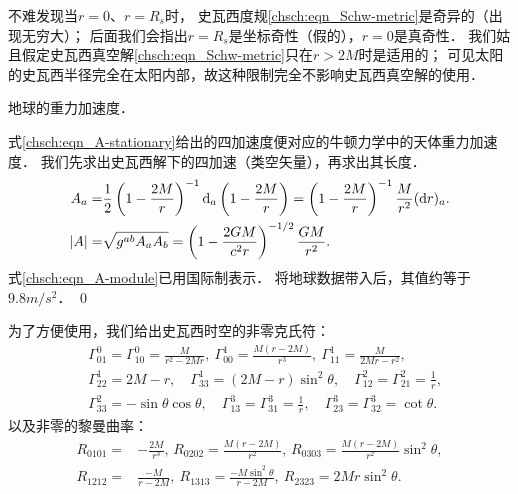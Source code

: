 不难发现当$r=0$、$r=R_s$时，
史瓦西度规\eqref{chsch:eqn_Schw-metric}是奇异的（出现无穷大）；
后面我们会指出$r=R_s$是坐标奇性（假的），$r=0$是真奇性．
我们姑且假定史瓦西真空解\eqref{chsch:eqn_Schw-metric}只在$r>2M$时是适用的；
可见太阳的史瓦西半径完全在太阳内部，故这种限制完全不影响史瓦西真空解的使用．



\begin{example}
    地球的重力加速度．
\end{example}

式\eqref{chsch:eqn_A-stationary}给出的四加速度便对应的牛顿力学中的天体重力加速度．
我们先求出史瓦西解下的四加速（类空矢量），再求出其长度．
\begin{align}
    A_a = & %
    \frac{1}{2} \left(1-\frac{2 M}{ r}\right)^{-1} {\rm d}_a \left(1-\frac{2 M}{ r}\right)
    =\left(1-\frac{2 M}{ r}\right)^{-1} \frac{ M}{ r^2}({\rm d}r)_a . \\
    |A|=& \sqrt{g^{ab}A_a A_b} = \left(1-\frac{2G M}{c^2 r}\right)^{-1/2}
    \frac{G M}{ r^2}. \label{chsch:eqn_A-module}
\end{align}
式\eqref{chsch:eqn_A-module}已用国际制表示．
将地球数据带入后，其值约等于$9.8 \si{m/s^2}$．
\qed


为了方便使用，我们给出史瓦西时空的非零克氏符：
\begin{equation}\label{chsch:eqn_Schw-Christoffel}
	\begin{aligned}
		&\Gamma^0_{01}= \Gamma^0_{10} = \frac{M}{r^2-2 M r},\
		\Gamma^1_{00}= \frac{M (r-2 M)}{r^3}, \
		\Gamma^1_{11}= \frac{M}{2 M r-r^2}, \\
		&\Gamma^1_{22}= 2 M-r, \quad
		\Gamma^1_{33}= (2 M-r) \sin ^2\theta  , \quad
		\Gamma^2_{12}=\Gamma^2_{21}= \frac{1}{r}, \\
		&\Gamma^2_{33}=-\sin\theta \cos\theta, \quad
		\Gamma^3_{13}=\Gamma^3_{31}=\frac{1}{r}, \quad
		\Gamma^3_{23}=\Gamma^3_{32}=\cot\theta .
	\end{aligned}
\end{equation}
以及非零的黎曼曲率：
\begin{equation}\label{chsch:eqn_Schw-Riemann}
	\begin{aligned}
		R_{0101}=&-\frac{2 M}{r^3},\, R_{0202}=\frac{M(r-2M)}{r^2},\, R_{0303}=\frac{M(r-2M)}{r^2} \sin ^2 \theta, \\ 
		R_{1212}=&\frac{-M}{r-2M}, \ R_{1313}=\frac{-M\sin ^2 \theta}{r-2M}, \ R_{2323}=2 M r \sin ^2 \theta .
	\end{aligned}
\end{equation}



